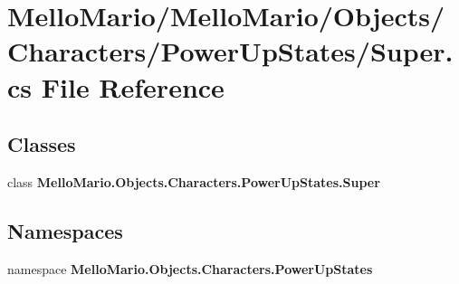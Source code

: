 \section{Mello\+Mario/\+Mello\+Mario/\+Objects/\+Characters/\+Power\+Up\+States/\+Super.cs File Reference}
\label{Super_8cs}
\subsection*{Classes}
\begin{DoxyCompactItemize}
\item 
class \textbf{ Mello\+Mario.\+Objects.\+Characters.\+Power\+Up\+States.\+Super}
\end{DoxyCompactItemize}
\subsection*{Namespaces}
\begin{DoxyCompactItemize}
\item 
namespace \textbf{ Mello\+Mario.\+Objects.\+Characters.\+Power\+Up\+States}
\end{DoxyCompactItemize}
